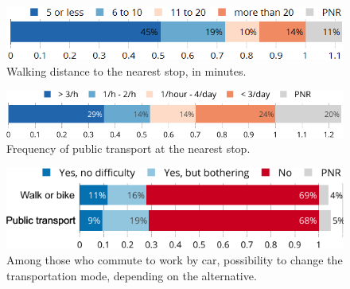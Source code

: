 \documentclass[english,5p,authoryear]{elsarticle}
\begin{document}



\begin{figure}[t]
\centering
\includegraphics[width=\columnwidth]{Images/transports_distance_trim.png}
\caption{Walking distance to the nearest stop, in minutes.}
\label{fig:transports_distance}
\end{figure}

\begin{figure}[t]
\centering
\includegraphics[width=\columnwidth]{Images/transports_frequency_trim.png}
\caption{Frequency of public transport at the nearest stop.}
\label{fig:transports_frequency}
\end{figure}

\begin{figure}[b]
\centering
\includegraphics[width=\columnwidth]{Images/transports_work.png}
\caption{Among those who commute to work by car, possibility to change the transportation mode, depending on the alternative.}
\label{fig:transports_work}
\end{figure}
    
\end{document}
